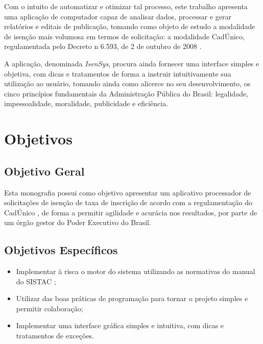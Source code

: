 \documentclass[
	12pt,			%
	openright,		%
	oneside,	
	a4paper,		%
	english,		%
	brazil			%
]{abntex2/abntex2}  %
\begin{document}
		Com o intuito de automatizar e otimizar tal processo, este trabalho apresenta uma aplicação de computador capaz de analisar dados, processar e gerar relatórios e editais de publicação, tomando como objeto de estudo a modalidade de isenção mais volumosa em termos de solicitação: a modalidade CadÚnico, regulamentada pelo Decreto n{\textdegree} 6.593, de 2 de outubro de 2008 \cite{cadunico-decreto}.
		
		A aplicação, denominada \textit{IsenSys}, procura ainda fornecer uma interface simples e objetiva, com dicas e tratamentos de forma a instruir intuitivamente sua utilização ao usuário, tomando ainda como alicerce no seu desenvolvimento, os cinco princípios fundamentais da Administração Pública do Brasil: legalidade, impessoalidade, moralidade, publicidade e eficiência.

		\section{Objetivos}
		
			\subsection{Objetivo Geral}
			
			Esta monografia possui como objetivo apresentar um aplicativo processador de solicitações de isenção de taxa de inscrição de acordo com a regulamentação do CadÚnico \cite{cadunico-decreto}, de forma a permitir agilidade e acurácia nos resultados, por parte de um órgão gestor do Poder Executivo do Brasil.
			
			\subsection{Objetivos Específicos}
			
			\begin{itemize}
				
				\item Implementar à risca o motor do sistema utilizando as normativas do manual do SISTAC \cite{sistac-formatos};
				\item Utilizar das boas práticas de programação para tornar o projeto simples e permitir colaboração;
				\item Implementar uma interface gráfica simples e intuitiva, com dicas e tratamentos de exceções.
				
			\end{itemize}
		
\end{document}
